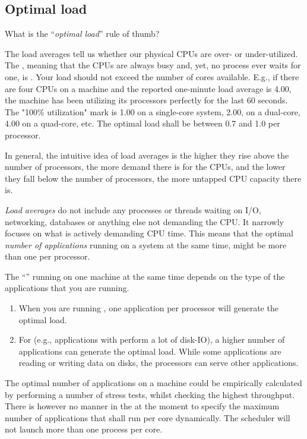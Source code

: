 \subsection{Optimal load}

What is the ``\emph{optimal load}'' rule of thumb?

The load averages tell us whether our physical CPUs are over- or
under-utilized. The , meaning that the
CPUs are always busy and, yet, no process ever waits for one, is .  Your load should not exceed the number
of cores available.  E.g., if there are four CPUs on a machine and the reported
one-minute load average is 4.00, the machine has been utilizing its processors
perfectly for the last 60 seconds. The "100\% utilization" mark is 1.00 on a
single-core system, 2.00, on a dual-core, 4.00 on a quad-core, etc. The optimal
load shall be between 0.7 and 1.0 per processor.

In general, the intuitive idea of load averages is the higher they rise above
the number of processors, the more demand there is for the CPUs, and the lower
they fall below the number of processors, the more untapped CPU capacity there
is.

\emph{Load averages} do not include any processes or threads waiting on I/O,
networking, databases or anything else not demanding the CPU. It narrowly
focuses on what is actively demanding CPU time. This means that the optimal
\emph{number of applications} running on a system at the same time, might be
more than one per processor.

The ``'' running on one machine at the
same time depends on the type of the applications that you are running.

\begin{enumerate}
\item  When you are running , one
  application per processor will generate the optimal load.
\item  For  (e.g., applications with perform
  a lot of disk-IO), a higher number of applications can generate the optimal
  load. While some applications are reading or writing data on disks, the
  processors can serve other applications.
\end{enumerate}

The optimal number of applications on a machine could be empirically calculated
by performing a number of stress tests, whilst checking the highest throughput.
There is however no manner in the \hpc at the moment to specify the maximum
number of applications that shall run per core dynamically. The \hpc scheduler
will not launch more than one process per core.

